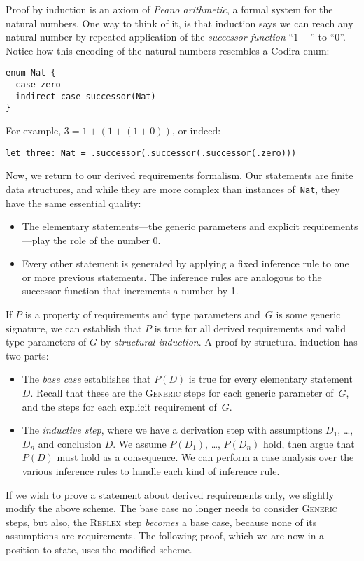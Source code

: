 \documentclass[../generics]{subfiles}
\begin{document}
Proof by induction is an axiom of \emph{Peano arithmetic}, a formal system for the natural numbers. One way to think of it, is that induction says we can reach any natural number by repeated application of the \emph{successor function} ``$1+{}$'' to ``0''. Notice how this encoding of the natural numbers resembles a Codira enum:
\begin{Verbatim}
enum Nat {
  case zero
  indirect case successor(Nat)
}
\end{Verbatim}
For example, $3=1+(1+(1+0))$, or indeed:
\begin{Verbatim}
let three: Nat = .successor(.successor(.successor(.zero)))
\end{Verbatim}
Now, we return to our derived requirements formalism. Our statements are finite data structures, and while they are more complex than instances of~\texttt{Nat}, they have the same essential quality:
\begin{itemize}
\item The elementary statements---the generic parameters and explicit requirements---play the role of the number 0.
\item Every other statement is generated by applying a fixed inference rule to one or more previous statements. The inference rules are analogous to the successor function that increments a number by 1.
\end{itemize}
If $P$ is a property of requirements and type parameters and~$G$ is some generic signature, we can establish that $P$ is true for all derived requirements and valid type parameters of $G$ by \emph{structural induction}. A proof by structural induction has two parts:
\begin{itemize}
\item The \emph{base case} establishes that $P(D)$ is true for every elementary statement $D$. Recall that these are the \textsc{Generic} steps for each generic parameter of~$G$, and the steps for each explicit requirement of~$G$.
\item The \emph{inductive step}, where we have a derivation step with assumptions $D_1$, \ldots, $D_n$ and conclusion $D$. We assume $P(D_1)$, \ldots, $P(D_n)$ hold, then argue that $P(D)$ must hold as a consequence. We can perform a case analysis over the various inference rules to handle each kind of inference rule.
\end{itemize}
If we wish to prove a statement about derived requirements only, we slightly modify the above scheme. The base case no longer needs to consider \textsc{Generic} steps, but also, the \textsc{Reflex} step \emph{becomes} a base case, because none of its assumptions are requirements. The following proof, which we are now in a position to state, uses the modified scheme.
\end{document}
